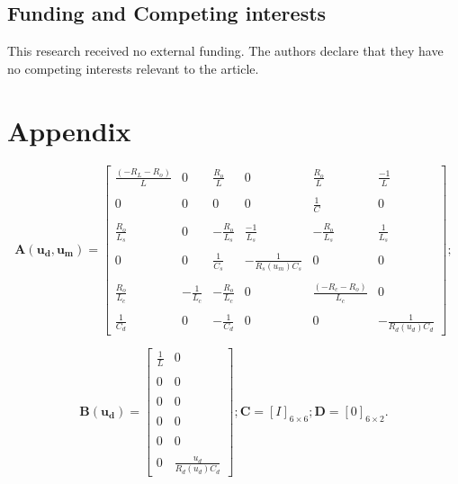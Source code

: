 \documentclass[preprint,12pt]{elsarticle}
\begin{document}
\subsection*{Funding and Competing interests} This research received no external funding. The authors declare that they have no competing interests relevant to the article.


\appendix
\section*{Appendix} 
\begin{equation*}
\mathbf{A(u_{d}, u_{m})}=\begin{bmatrix}
\frac{\left(-R_{L}-R_{o}\right)}{L}&0&\frac{R_{o}}{L}&0&\frac{R_{o}}{L}&\frac{-1}{L}\\ \\  0&0&0&0&\frac{1}{C} &0 \\ \\  \frac{R_{o}}{L_{s}}&0& -\frac{R_{o}}{L_{s}}&\frac{-1}{L_{s}}&-\frac{R_{o}}{L_{s}}&\frac{1}{L_{s}}
\\ \\  0&0&\frac{1}{C_{s}}&-\frac{1}{R_{s}(u_{m})C_{s}} &0 &0 \\ \\ 
\frac{R_{o}}{L_{c}}&-\frac{1}{L_{c}}&-\frac{R_{o}}{L_{c}}&0&\frac{\left(-R_{c}-R_{o}\right)}{L_{c}}&0 \\ \\
\frac{1}{C_{d}}&0&-\frac{1}{C_{d}}&0&0&-\frac{1}{R_{d}(u_{d})C_{d}}
\end{bmatrix};
\end{equation*}

\begin{equation*}
\mathbf{B(u_{d})}=\begin{bmatrix}
\frac{1}{L}&0\\ \\  0&0 \\ \\  0&0
\\ \\  0&0\\ \\ 
0&0 \\ \\ 0 & \frac{u_{d}}{R_{d}(u_{d})C_{d}}
\end{bmatrix};
\mathbf{C}=\left[I\right]_{6\times 6} ;\mathbf{D}=\left[0\right]_{6\times 2}.
\end{equation*}


  
 
\end{document}
